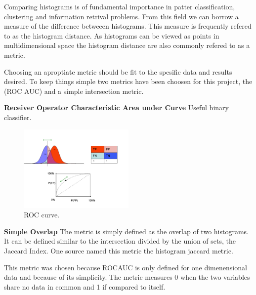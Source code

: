 \documentclass[altfont, fleqn]{uiophd}
\begin{document}
Comparing histograms is of fundamental importance in patter classification, 
clustering and information retrival problems. 
From this field we can borrow a measure of the difference betweeen histograms. 
This measure is frequently refered to as the histogram distance. 
As histograms can be viewed as points in multidimensional space 
the histogram distance are also commonly refered to as a metric. 

Choosing an aproptiate metric should be fit to the spesific data and results
desired. 
To keep things simple two metrics have been choosen for this project, 
the (ROC AUC) and a simple intersection metric. 

\noindent
{\bf Receiver Operator Characteristic Area under Curve}
Useful binary classifier. 
\begin{figure}[h]
    \begin{center}
        \includegraphics[width=0.5\textwidth]{images/sec_3/roc_curve.pdf}
        \caption{
            ROC curve. 
        }
        \label{fig:3_roc_auc}
    \end{center}
\end{figure}
\newline 

\noindent
{\bf Simple Overlap}
The metric is simply defined as the overlap
of two histograms. 
It can be defined similar to the intersection divided by the union of sets, 
the Jaccard Index. 
One source named this metric the histogram jaccard metric. 

This metric was chosen because ROCAUC is only defined for one
dimenensional data and because of its simplicity.
The metric measures 0 when the two variables share no data in common 
and 1 if compared to itself. 
\newline 
\end{document}
